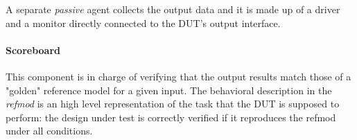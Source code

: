 A separate \textit{passive} agent collects the output data and it is made up of a driver and a monitor directly connected to the DUT's output interface.

\paragraph{Scoreboard} This component is in charge of verifying that the output results match those of a "golden" reference model for a given input. The behavioral description in the \textit{refmod} is an high level representation of the task that the DUT is supposed to perform: the design under test is correctly verified if it reproduces the refmod under all conditions.



